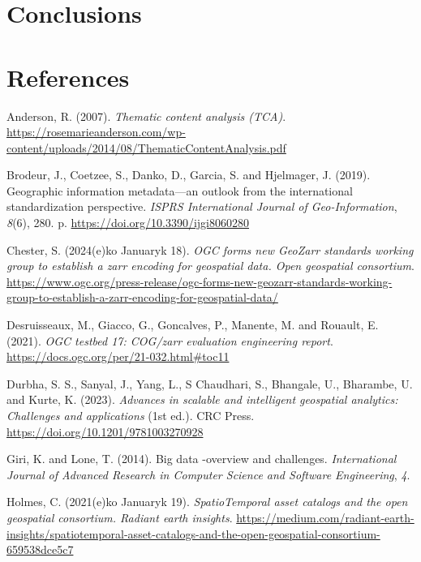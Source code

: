 \documentclass[
  oneside,
  open=any]{scrbook}
\newlength{\cslhangindent}
\newenvironment{CSLReferences}[2] %
 {\begin{list}{}{%
  \setlength{\itemindent}{0pt}
  \setlength{\leftmargin}{0pt}
  \setlength{\parsep}{0pt}
  \ifodd #1
   \setlength{\leftmargin}{\cslhangindent}
   \setlength{\itemindent}{-1\cslhangindent}
  \fi
  \setlength{\itemsep}{#2\baselineskip}}}
 {\end{list}}
\begin{document}
\chapter{Conclusions}\label{conclusions}

\chapter*{References}\label{references}

\label{refs}
\begin{CSLReferences}{1}{0}
Anderson, R. (2007). \emph{Thematic content analysis ({TCA})}.
\url{https://rosemarieanderson.com/wp-content/uploads/2014/08/ThematicContentAnalysis.pdf}

Brodeur, J., Coetzee, S., Danko, D., Garcia, S. and Hjelmager, J.
(2019). Geographic information metadata---an outlook from the
international standardization perspective. \emph{{ISPRS} International
Journal of Geo-Information}, \emph{8}(6), 280. p.
\url{https://doi.org/10.3390/ijgi8060280}

Chester, S. (2024(e)ko Januaryk 18). \emph{{OGC} forms new {GeoZarr}
standards working group to establish a zarr encoding for geospatial
data. Open geospatial consortium}.
\url{https://www.ogc.org/press-release/ogc-forms-new-geozarr-standards-working-group-to-establish-a-zarr-encoding-for-geospatial-data/}

Desruisseaux, M., Giacco, G., Goncalves, P., Manente, M. and Rouault, E.
(2021). \emph{{OGC} testbed 17: {COG}/zarr evaluation engineering
report}. \url{https://docs.ogc.org/per/21-032.html\#toc11}

Durbha, S. S., Sanyal, J., Yang, L., S Chaudhari, S., Bhangale, U.,
Bharambe, U. and Kurte, K. (2023). \emph{Advances in scalable and
intelligent geospatial analytics: Challenges and applications} (1st
ed.). {CRC} Press. \url{https://doi.org/10.1201/9781003270928}

Giri, K. and Lone, T. (2014). Big data -overview and challenges.
\emph{International Journal of Advanced Research in Computer Science and
Software Engineering}, \emph{4}.

Holmes, C. (2021(e)ko Januaryk 19). \emph{{SpatioTemporal} asset
catalogs and the open geospatial consortium. Radiant earth insights}.
\url{https://medium.com/radiant-earth-insights/spatiotemporal-asset-catalogs-and-the-open-geospatial-consortium-659538dce5c7}


\end{CSLReferences}
\end{document}
